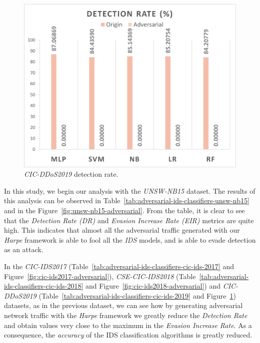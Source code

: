 \begin{figure}
    \centering
    \includegraphics[width=.95\columnwidth]{Figures/CIC-IDS-2019}
    \caption{\label{fig:cic-ids2019-adversarial} \textit{CIC-DDoS2019} detection rate.}
\end{figure}

In this study, we begin our analysis with the \textit{UNSW-NB15} dataset.
The results of this analysis can be observed in Table~\ref{tab:adversarial-ids-classifiers-unsw-nb15} and in the
Figure~\ref{fig:unsw-nb15-adversarial}.
From the table, it is clear to see that the \textit{Detection Rate (DR)} and \textit{Evasion Increase Rate (EIR)}
metrics are quite high.
This indicates that almost all the adversarial traffic generated with our \textit{Harpe} framework is able to fool all
the \textit{IDS} models, and is able to evade detection as an attack.

In the \textit{CIC-IDS2017} (Table~\ref{tab:adversarial-ids-classifiers-cic-ids-2017} and
Figure~\ref{fig:cic-ids2017-adversarial}), \textit{CSE-CIC-IDS2018}
(Table~\ref{tab:adversarial-ids-classifiers-cic-ids-2018} and Figure~\ref{fig:cic-ids2018-adversarial})
and \textit{CIC-DDoS2019} (Table~\ref{tab:adversarial-ids-classifiers-cic-ids-2019} and
Figure~\ref{fig:cic-ids2019-adversarial})
datasets, as in the previous dataset, we can see how by generating adversarial network traffic with the \textit{Harpe}
framework we greatly reduce the \textit{Detection Rate} and obtain values very close to the maximum in the
\textit{Evasion Increase Rate}.
As a consequence, the \textit{accuracy} of the IDS classification algorithms is greatly reduced.

